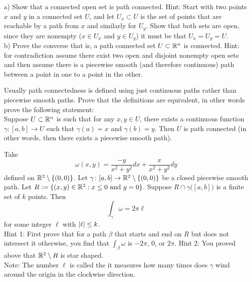 \begin{exercise}
a)
Show that a connected open set is path connected.  Hint: Start with two
points $x$ and $y$ in a connected set $U$, and let $U_x \subset U$ is the set of points that are
reachable by a path from $x$ and similarly for $U_y$.  Show that both sets
are open, since they are nonempty ($x \in U_x$ and $y \in U_y$) it must be
that $U_x = U_y = U$.
\\
b) Prove the converse that is, a path connected set $U \subset {\mathbb{R}}^n$ is
connected.  Hint: for contradiction assume there exist two open and disjoint nonempty open
sets and then assume there is a piecewise smooth (and therefore continuous)
path between a point in one to a point in the other.
\end{exercise}

\begin{exercise}
Usually path connectedness is defined using just continuous paths rather
than piecewise smooth paths.  Prove that the definitions are equivalent, in
other words prove the following statement:\\
Suppose $U \subset {\mathbb{R}}^n$ is such that for any $x,y \in U$, there exists a continuous function
$\gamma \colon [a,b] \to U$ such that $\gamma(a) = x$ and $\gamma(b) = y$.
Then $U$ is path connected (in other words, then there exists a piecewise
smooth path).
\end{exercise}

\begin{exercise}[Hard]
Take
\begin{equation*}
\omega(x,y) = \frac{-y}{x^2+y^2} dx + \frac{x}{x^2+y^2} dy
\end{equation*}
defined on ${\mathbb{R}}^2 \setminus \{ (0,0) \}$.  Let $\gamma \colon [a,b] \to {\mathbb{R}}^2
\setminus \{ (0,0) \}$ be a closed piecewise smooth path.
Let $R:=\{ (x,y) \in {\mathbb{R}}^2 : x \leq 0 \text{ and } y=0 \}$.
Suppose $R \cap \gamma\bigl([a,b]\bigr)$ is a finite set of $k$ points.  Then
\begin{equation*}
\int_{\gamma} \omega = 2 \pi \ell 
\end{equation*}
for some integer $\ell$ with $\left\lvert {\ell} \right\rvert \leq k$.\\
Hint 1: First prove that for a path $\beta$ that starts and end on $R$ but
does not intersect it otherwise, you find that $\int_{\beta} \omega$
is $-2\pi$, 0, or $2\pi$.
Hint 2: You proved above that ${\mathbb{R}}^2 \setminus R$ is star shaped.
\\
Note: The number $\ell$ is called the \emph{} it measures how many
times does $\gamma$ wind around the origin in the clockwise direction.
\end{exercise}
